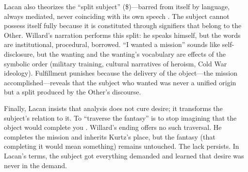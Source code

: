 Lacan also theorizes the ``split subject'' (\$)---barred from itself by language, always 
mediated, never coinciding with its own speech \parencite{LacanEcrits2006}. The subject cannot 
possess itself fully because it is constituted through signifiers that belong to the Other. 
Willard's narration performs this split: he speaks himself, but the words are institutional, 
procedural, borrowed. ``I wanted a mission'' sounds like self-disclosure, but the wanting and 
the wanting's vocabulary are effects of the symbolic order (military training, cultural 
narratives of heroism, Cold War ideology). Fulfillment punishes because the delivery of the 
object---the mission accomplished---reveals that the subject who wanted was never a unified 
origin but a split produced by the Other's discourse.

Finally, Lacan insists that analysis does not cure desire; it transforms the subject's relation 
to it. To ``traverse the fantasy'' is to stop imagining that the object would complete you 
\parencite{LacanSeminarXI1991}. Willard's ending offers no such traversal. He completes the 
mission and inherits Kurtz's place, but the fantasy (that completing it would mean something) 
remains untouched. The lack persists. In Lacan's terms, the subject got everything demanded 
and learned that desire was never in the demand.

